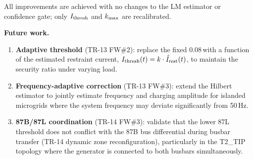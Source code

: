 \documentclass[11pt,a4paper]{article}
\newcommand{\pu}{\,\text{pu}}
\begin{document}
All improvements are achieved with no changes to the LM estimator or
confidence gate; only $I_{\rm thresh}$ and $k_{\rm max}$ are recalibrated.

\bigskip\noindent
\textbf{Future work.}
\begin{enumerate}
  \item \textbf{Adaptive threshold} (TR-13 FW\#2): replace the fixed
        0.08\pu with a function of the estimated restraint current,
        $I_{\rm thresh}(t) = k \cdot \hat{I}_{\rm rest}(t)$, to maintain
        the security ratio under varying load.

  \item \textbf{Frequency-adaptive correction} (TR-13 FW\#3): extend the
        Hilbert estimator to jointly estimate frequency and charging
        amplitude for islanded microgrids where the system frequency may
        deviate significantly from 50\,Hz.

  \item \textbf{87B/87L coordination} (TR-14 FW\#3): validate that the
        lower 87L threshold does not conflict with the 87B bus differential
        during busbar transfer (TR-14 dynamic zone reconfiguration),
        particularly in the T2\_TIP topology where the generator is
        connected to both busbars simultaneously.
\end{enumerate}



\end{document}
